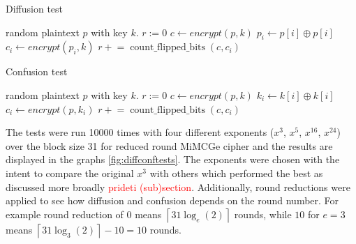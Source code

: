 \documentclass{Resources/UoBLab1}
\theoremstyle{definition}
\begin{document}
\begin{minipage}{0.46\textwidth}
\begin{algorithm}[H]
    \caption{Diffusion test}\label{alg:diff}
    \begin{algorithmic}
        \Require random plaintext $p$ with key $k$.
        \State $r := 0$
        \State $c \gets encrypt(p, k)$
            \State $p_i \gets p[i] \oplus p[i]$ 
            \State $c_i \gets encrypt(p_i, k)$
            \State $r \mathrel{+}= \operatorname{count\_flipped\_bits}(c, c_i)$
        \EndFor
    \end{algorithmic}
\end{algorithm}
\end{minipage}
\hfill
\begin{minipage}{0.46\textwidth}
\begin{algorithm}[H]
    \caption{Confusion test}\label{alg:conf}
    \begin{algorithmic}
        \Require random plaintext $p$ with key $k$.
        \State $r := 0$
        \State $c \gets encrypt(p, k)$
            \State $k_i \gets k[i] \oplus k[i]$ 
            \State $c_i \gets encrypt(p, k_i)$
            \State $r \mathrel{+}= \operatorname{count\_flipped\_bits}(c, c_i)$
        \EndFor
    \end{algorithmic}
\end{algorithm}
\end{minipage}

The tests were run 10000 times with four different exponents ($x^3$, $x^5$, $x^{16}$, $x^{24}$) over the block size 31 for reduced round MiMCGe cipher and the results are displayed in the graphs \ref{fig:diffconftests}. The exponents were chosen with the intent to compare the original $x^3$ with others which performed the best as discussed more broadly \textcolor{red}{prideti (sub)section}. Additionally, round reductions were applied to see how diffusion and confusion depends on the round number. For example round reduction of $0$ means $\left\lceil 31\log_e(2) \right\rceil$ rounds, while $10$ for $e = 3$ means \(\left\lceil 31\log_3(2) \right\rceil - 10 = 10\) rounds.
\end{document}
